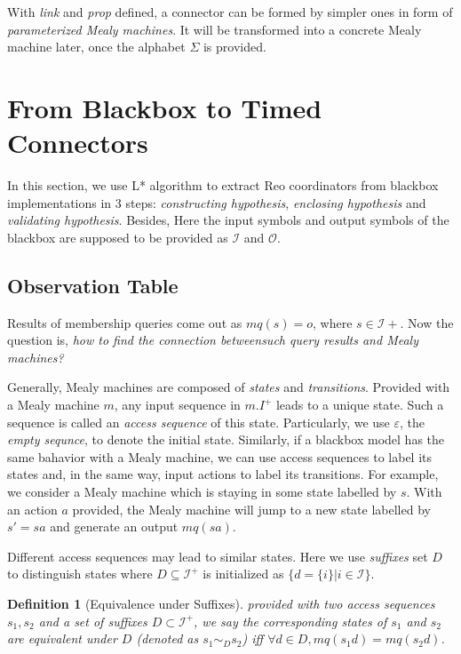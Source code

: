 \documentclass[conference, a4paper]{IEEEtran}
\newtheorem{definition}{Definition}
\begin{document}
With \emph{link} and \emph{prop} defined, a connector can be formed by simpler ones in
form of \emph{parameterized Mealy machines}. It will be transformed into a concrete Mealy machine
later, once the alphabet $\Sigma$ is provided.

\section{From Blackbox to Timed Connectors} 
\label{sec:activelearning}
In this section, we use L* algorithm to extract Reo coordinators from blackbox
implementations in 3 steps:
\emph{constructing hypothesis}, \emph{enclosing hypothesis} and \emph{validating hypothesis}. Besides,
Here the input symbols and output symbols of the blackbox are supposed to be provided as $\mathcal{I}$
and $\mathcal{O}$.

\subsection{Observation Table}
Results of membership queries come out as $mq(s)=o$, where $s\in\mathcal{I}+$.
Now the question is, \emph{how to find the connection betweensuch query results and Mealy machines?}

Generally, Mealy machines are composed of \emph{states} and \emph{transitions}.
Provided with a Mealy machine $m$, any input sequence in $m.I^+$ leads to a unique state. 
Such a sequence is called an \emph{access sequence} of this state.
Particularly, we use $\varepsilon$, the \emph{empty sequnce}, to denote the initial state.
Similarly, if a blackbox model has the same bahavior with a Mealy machine, we can use access
sequences to label its states and, in the same way, input actions to label its transitions.
For example, we consider a Mealy machine which is staying in some state labelled by $s$. With an
action $a$ provided, the Mealy machine will jump to a new state labelled by $s'=sa$ and generate an
output $mq(sa)$. 

Different access sequences may lead to similar states. Here we use \emph{suffixes} set $D$ to
distinguish states where $D\subseteq \mathcal{I}^+$ is initialized as $\{d=\{i\}|i\in\mathcal{I}\}$. 
\begin{definition}[Equivalence under Suffixes]
  provided with two access sequences $s_1,s_2$ and a set of suffixes $D\subset\mathcal{I}^+$, we say
  the corresponding states of $s_1$ and $s_2$ are equivalent under $D$ (denoted as $s_1\sim_D s_2$)
  iff $\forall d\in D, mq(s_1d) = mq(s_2d)$.
\end{definition}
\end{document}
